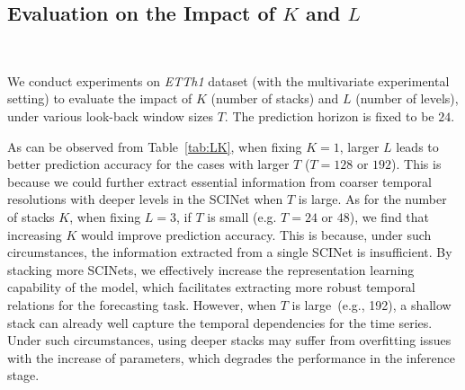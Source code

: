 \documentclass{article}
\begin{document}
\subsection{Evaluation on the Impact of $K$ and $L$}~\label{appendix:KL}

We conduct experiments on \emph{ETTh1} dataset (with the multivariate experimental setting) to evaluate the impact of $K$ (number of stacks) and $L$ (number of levels), under various look-back window sizes $T$. The prediction horizon is fixed to be $24$.  

As can be observed from Table~\ref{tab:LK}, when fixing $K=1$,
larger $L$ leads to better prediction accuracy for the cases with larger $T$ ($T\!=\!128$ or $192$).
This is because we could further extract essential information from coarser temporal resolutions with deeper levels in the SCINet when $T$ is large. 
As for the number of stacks $K$, when fixing $L=3$, if $T$ is small (e.g. $T\!=\!24$ or $48$), we find that increasing $K$ would improve prediction accuracy. This is because, under such circumstances, the information extracted from a single SCINet is insufficient. By stacking more SCINets, we effectively increase the representation learning capability of the model, which facilitates extracting more robust temporal relations for the forecasting task. 
However, 
when $T$ is large~(e.g., 192), a shallow stack can already well capture the temporal dependencies for the time series. Under such circumstances, using deeper stacks may suffer from overfitting issues with the increase of parameters, which degrades the performance in the inference stage.
\end{document}
